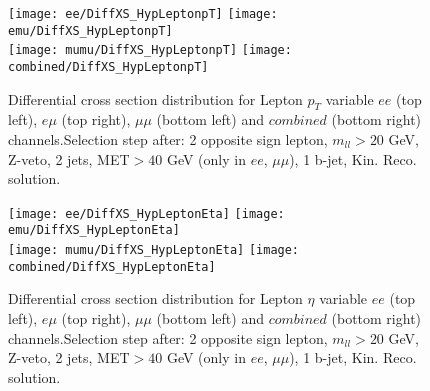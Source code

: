 


\begin{figure}
  \texttt{[image: ee/DiffXS\_HypLeptonpT]}
  \texttt{[image: emu/DiffXS\_HypLeptonpT]}\\
  \texttt{[image: mumu/DiffXS\_HypLeptonpT]}
  \texttt{[image: combined/DiffXS\_HypLeptonpT]}
\caption{Differential cross section distribution for  Lepton $p_T$ variable  $ee$ (top left), $e\mu$ (top right), $\mu\mu$ (bottom left) and $combined$ (bottom right) channels.\newline Selection step after: 2 opposite sign lepton, $m_{ll}>20$ GeV, Z-veto, 2 jets, MET$>40$ GeV (only in $ee$, $\mu\mu$), 1 b-jet, Kin. Reco. solution.}
\end{figure}

\clearpage
\newpage


\begin{figure}
  \texttt{[image: ee/DiffXS\_HypLeptonEta]}
  \texttt{[image: emu/DiffXS\_HypLeptonEta]}\\
  \texttt{[image: mumu/DiffXS\_HypLeptonEta]}
  \texttt{[image: combined/DiffXS\_HypLeptonEta]}
\caption{Differential cross section distribution for  Lepton $\eta$ variable  $ee$ (top left), $e\mu$ (top right), $\mu\mu$ (bottom left) and $combined$ (bottom right) channels.\newline Selection step after: 2 opposite sign lepton, $m_{ll}>20$ GeV, Z-veto, 2 jets, MET$>40$ GeV (only in $ee$, $\mu\mu$), 1 b-jet, Kin. Reco. solution.}
\end{figure}

